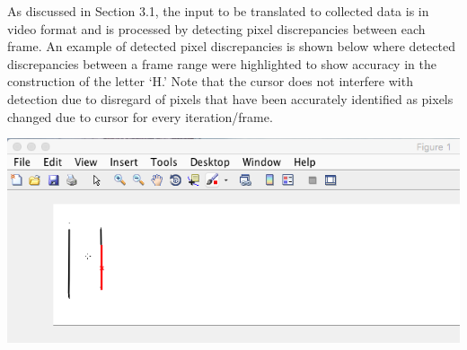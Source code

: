 \documentclass{article} %
\begin{document}
As discussed in Section 3.1, the input to be translated to collected data is in video format and is processed by detecting pixel discrepancies between each frame. An example of detected pixel discrepancies is shown below where detected discrepancies between a frame range were highlighted to show accuracy in the construction of the letter ‘H.’ Note that the cursor does not interfere with detection due to disregard of pixels that have been accurately identified as pixels changed due to cursor for every iteration/frame.
\begin{center}
\includegraphics[scale = 0.4]{detection_data.png}
\end{center}
\end{document}
